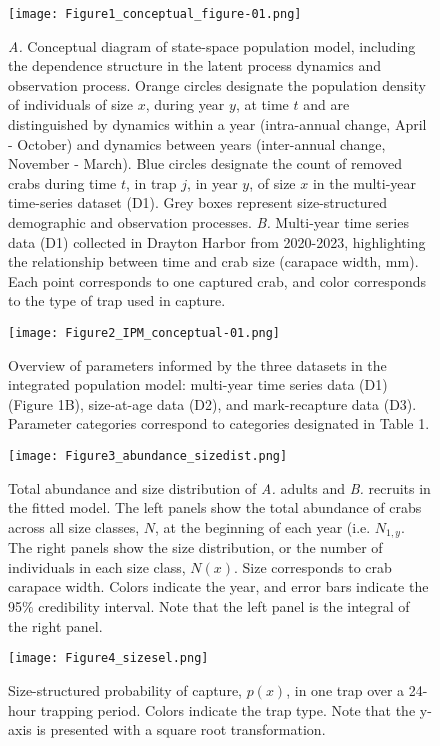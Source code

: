 \documentclass{article}
\begin{document}
\begin{figure}[H]
    \centering
    \texttt{[image: Figure1\_conceptual\_figure-01.png]}
    \caption{\textit{A.} Conceptual diagram of state-space population model, including the dependence structure in the latent process dynamics and observation process. Orange circles designate the population density of individuals of size $x$, during year $y$, at time $t$ and are distinguished by dynamics within a year (intra-annual change, April - October) and dynamics between years (inter-annual change, November - March). Blue circles designate the count of removed crabs during time $t$, in trap $j$, in year $y$, of size $x$ in the multi-year time-series dataset (D1). Grey boxes represent size-structured demographic and observation processes. \textit{B.} Multi-year time series data (D1) collected in Drayton Harbor from 2020-2023, highlighting the relationship between time and crab size (carapace width, mm). Each point corresponds to one captured crab, and color corresponds to the type of trap used in capture.}
\end{figure}

\begin{figure}[H]
    \centering
    \texttt{[image: Figure2\_IPM\_conceptual-01.png]}
    \caption{Overview of parameters informed by the three datasets in the integrated population model: multi-year time series data (D1) (Figure 1B), size-at-age data (D2), and mark-recapture data (D3). Parameter categories correspond to categories designated in Table 1.}
\end{figure}

\begin{figure}[H]
    \centering
    \texttt{[image: Figure3\_abundance\_sizedist.png]}
    \caption{Total abundance and size distribution of \textit{A.} adults and \textit{B.} recruits in the fitted model. The left panels show the total abundance of crabs across all size classes, $N$, at the beginning of each year (i.e. $N_{1, y}$. The right panels show the size distribution, or the number of individuals in each size class, $N(x)$. Size corresponds to crab carapace width. Colors indicate the year, and error bars indicate the 95\% credibility interval. Note that the left panel is the integral of the right panel.}
\end{figure}

\begin{figure}[H]
    \centering
    \texttt{[image: Figure4\_sizesel.png]}
    \caption{Size-structured probability of capture, $p(x)$, in one trap over a 24-hour trapping period. Colors indicate the trap type. Note that the y-axis is presented with a square root transformation.}
\end{figure}
\end{document}
